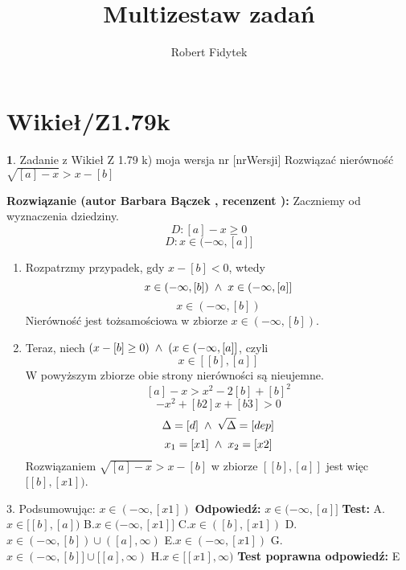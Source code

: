\documentclass[12pt, a4paper]{article}
\title{Multizestaw zadań}
\author{Robert Fidytek}
\date{}
\theoremstyle{definition} %
\newtheorem{zad}{}
\newcommand{\kategoria}[1]{\section{#1}} %
\newcommand{\zadStart}[1]{\begin{zad}#1\newline} %
\newcommand{\zadStop}{\end{zad}}   %
\newcommand{\rozwStart}[2]{\noindent \textbf{Rozwiązanie (autor #1 , recenzent #2): }\newline} %
\newcommand{\rozwStop}{\newline}                                            %
\newcommand{\odpStart}{\noindent \textbf{Odpowiedź:}\newline}    %
\newcommand{\odpStop}{\newline}                                             %
\newcommand{\testStart}{\noindent \textbf{Test:}\newline} %
\newcommand{\testStop}{\newline} %
\newcommand{\kluczStart}{\noindent \textbf{Test poprawna odpowiedź:}\newline} %
\newcommand{\kluczStop}{\newline} %
\begin{document}
\maketitle


\kategoria{Wikieł/Z1.79k}
\zadStart{Zadanie z Wikieł Z 1.79 k) moja wersja nr [nrWersji]}
Rozwiązać nierówność $\sqrt{[a]-x}>x-[b]$
\zadStop
\rozwStart{Barbara Bączek}{}
Zaczniemy od wyznaczenia dziedziny.
$$D:[a]-x \geq 0 $$
$$D: x \in (-\infty, [a]]$$
\begin{enumerate}
\item Rozpatrzmy przypadek, gdy $x-[b]<0$, wtedy 
$$x \in (-\infty,[b]) \hspace{0.1 cm} \wedge \hspace{0.1 cm} x \in (-\infty, [a]]$$
$$x \in (-\infty,[b])$$
Nierówność jest tożsamościowa w zbiorze $ x \in (-\infty, [b])$.
\item Teraz, niech $(x-[b] \geq 0) \hspace{0.1 cm} \wedge \hspace{0.1 cm} (x \in (-\infty, [a]]$, czyli
$$x \in [[b], [a]]$$
W powyższym zbiorze obie strony nierówności są nieujemne.
$$[a]-x>x^2-2[b]+{[b]}^2$$
$$-x^2 +[b2]x + [b3]>0$$
$$\Delta = [d] \hspace{0.1 cm} \wedge \hspace{0.1 cm} \sqrt{\Delta}=[dep]$$
$$x_1=[x1] \hspace{0.1 cm} \wedge \hspace{0.1cm}  x_2=[x2]$$
Rozwiązaniem $\sqrt{[a]-x}>x-[b]$ w zbiorze $[[b], [a]]$ jest więc $[[b], [x1])$.
\end{enumerate}
3. Podsumowując: $x \in (-\infty, [x1])$
\rozwStop
\odpStart
$x \in (-\infty, [a]]$
\odpStop
\testStart
A.$x \in [[b],[a])$
B.$x \in (-\infty, [x1]]$
C.$x \in ([b], [x1])$
D.$x \in (-\infty,[b]) \cup ([a], \infty)$
E.$x \in (-\infty, [x1])$
G.$x \in (-\infty,[b]] \cup [[a], \infty)$
H.$x \in [[x1], \infty)$
\testStop
\kluczStart
E
\kluczStop
\end{document}
